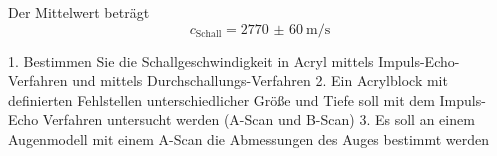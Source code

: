 Der Mittelwert beträgt
\begin{equation}
	c_\text{Schall}=\SI{2770(60)}{\meter\per\second}
	\label{qu:geschwindigkeit}
\end{equation}


1. Bestimmen Sie die Schallgeschwindigkeit in Acryl mittels Impuls-Echo-Verfahren und mittels Durchschallungs-Verfahren
2. Ein Acrylblock mit definierten Fehlstellen unterschiedlicher Größe und Tiefe soll mit dem Impuls-Echo Verfahren untersucht werden (A-Scan und B-Scan)
3. Es soll an einem Augenmodell mit einem A-Scan die Abmessungen des Auges bestimmt werden
